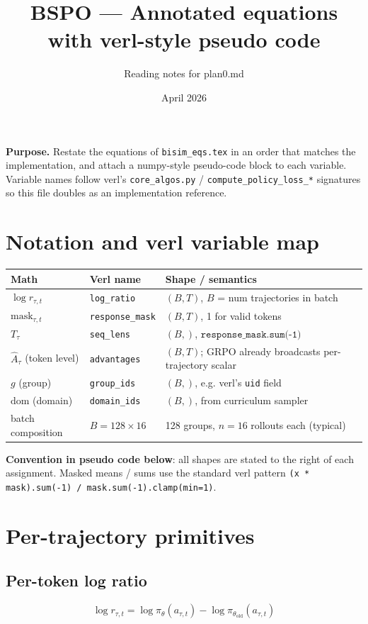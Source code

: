 \documentclass{article}
\title{BSPO --- Annotated equations with verl-style pseudo code}
\author{Reading notes for plan0.md}
\date{April 2026}
\begin{document}
\maketitle

\noindent
\textbf{Purpose.} Restate the equations of \texttt{bisim\_eqs.tex} in an order
that matches the implementation, and attach a numpy-style pseudo-code block
to each variable. Variable names follow verl's \texttt{core\_algos.py} /
\texttt{compute\_policy\_loss\_*} signatures so this file doubles as an
implementation reference.

\section{Notation and verl variable map}

\begin{tabular}{l|l|l}
\textbf{Math} & \textbf{Verl name} & \textbf{Shape / semantics} \\
\hline
$\log r_{\tau,t}$ & \texttt{log\_ratio} & $(B, T)$, $B$ = num trajectories in batch \\
$\text{mask}_{\tau,t}$ & \texttt{response\_mask} & $(B, T)$, 1 for valid tokens \\
$T_\tau$ & \texttt{seq\_lens} & $(B,)$, $\texttt{response\_mask.sum(-1)}$ \\
$\hat A_\tau$ (token level) & \texttt{advantages} & $(B, T)$; GRPO already broadcasts per-trajectory scalar \\
$g$ (group) & \texttt{group\_ids} & $(B,)$, e.g. verl's \texttt{uid} field \\
$\text{dom}$ (domain) & \texttt{domain\_ids} & $(B,)$, from curriculum sampler \\
batch composition & $B = 128 \times 16$ & 128 groups, $n=16$ rollouts each (typical) \\
\end{tabular}

\medskip
\noindent
\textbf{Convention in pseudo code below}: all shapes are stated to the right
of each assignment. Masked means / sums use the standard verl pattern
\verb|(x * mask).sum(-1) / mask.sum(-1).clamp(min=1)|.

\section{Per-trajectory primitives}

\subsection{Per-token log ratio}
\[
\log r_{\tau,t} = \log \pi_\theta(a_{\tau,t}) - \log \pi_{\theta_{\text{old}}}(a_{\tau,t})
\]
\end{document}
